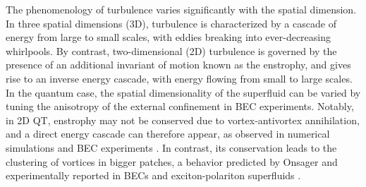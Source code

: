\documentclass[aps,prl,twocolumn,showpacs,notitlepage,floatfix,superscriptaddress]{revtex4-1}
\begin{document}
The phenomenology of turbulence varies significantly with the spatial dimension.
In three spatial dimensions (3D), turbulence is characterized by a cascade of energy from large to small scales, with eddies breaking into ever-decreasing whirlpools. By contrast, two-dimensional (2D) turbulence is governed by the presence of an additional invariant of motion known as the enstrophy, and gives rise to an inverse energy cascade, with energy flowing from small to large scales.
In the quantum case, the spatial dimensionality of the superfluid can be varied by tuning the anisotropy of the external confinement in BEC experiments.
Notably, in 2D
QT,
enstrophy may not be conserved due to vortex-antivortex annihilation, and a direct energy cascade can therefore appear, as observed in numerical simulations \cite{Numasato2010,Chesler13} and
BEC experiments \cite{Zhao25}.
In contrast, its conservation leads to the clustering of vortices in bigger patches,
a behavior predicted by Onsager and experimentally reported in
BECs
\cite{Gau19,Johnstone19}
and exciton-polariton superfluids \cite{Panico23}.
\end{document}

